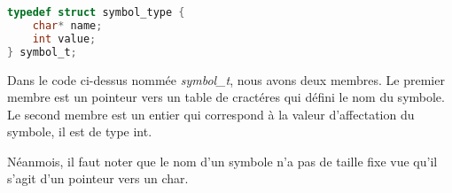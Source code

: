 \lstset{style=mystyle}
\begin{lstlisting}[language=C, caption=Structure d'un symbole]
typedef struct symbol_type {
    char* name;
    int value;
} symbol_t;
\end{lstlisting}

Dans le code ci-dessus nommée \textit{symbol\_t}, nous avons deux membres. Le premier membre est un pointeur vers un table de cractéres qui défini le nom du symbole. Le second membre est un entier qui correspond à la valeur d'affectation du symbole, il est de type int.

Néanmois, il faut noter que le nom d'un symbole n'a pas de taille fixe vue qu'il s'agit d'un pointeur vers un char.

\newpage